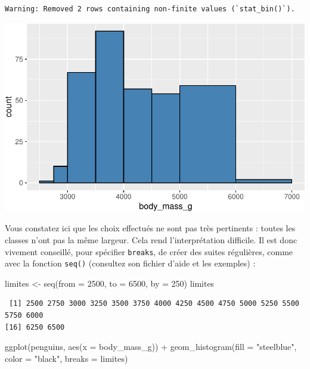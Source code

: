 \documentclass[
  a4paper,
  DIV=11,
  numbers=noendperiod,
  oneside]{scrreprt}
\newenvironment{Shaded}{}{}
\newcommand{\AttributeTok}[1]{\textcolor[rgb]{0.84,0.23,0.29}{#1}}
\newcommand{\DecValTok}[1]{\textcolor[rgb]{0.00,0.36,0.77}{#1}}
\newcommand{\FunctionTok}[1]{\textcolor[rgb]{0.44,0.26,0.76}{#1}}
\newcommand{\NormalTok}[1]{\textcolor[rgb]{0.14,0.16,0.18}{#1}}
\newcommand{\OtherTok}[1]{\textcolor[rgb]{0.44,0.26,0.76}{#1}}
\newcommand{\SpecialCharTok}[1]{\textcolor[rgb]{0.00,0.36,0.77}{#1}}
\newcommand{\StringTok}[1]{\textcolor[rgb]{0.01,0.18,0.38}{#1}}
\begin{document}
\begin{verbatim}
Warning: Removed 2 rows containing non-finite values (`stat_bin()`).
\end{verbatim}

\includegraphics{03-visualization_files/figure-pdf/unnamed-chunk-17-1.pdf}

Vous constatez ici que les choix effectués ne sont pas très pertinents :
toutes les classes n'ont pas la même largeur. Cela rend l'interprétation
difficile. Il est donc vivement conseillé, pour spécifier
\texttt{breaks}, de créer des suites régulières, comme avec la fonction
\texttt{seq()} (consultez son fichier d'aide et les exemples) :

\begin{Shaded}
\begin{Highlighting}[]
\NormalTok{limites }\OtherTok{\textless{}{-}} \FunctionTok{seq}\NormalTok{(}\AttributeTok{from =} \DecValTok{2500}\NormalTok{, }\AttributeTok{to =} \DecValTok{6500}\NormalTok{, }\AttributeTok{by =} \DecValTok{250}\NormalTok{)}
\NormalTok{limites}
\end{Highlighting}
\end{Shaded}

\begin{verbatim}
 [1] 2500 2750 3000 3250 3500 3750 4000 4250 4500 4750 5000 5250 5500 5750 6000
[16] 6250 6500
\end{verbatim}

\begin{Shaded}
\begin{Highlighting}[]
\FunctionTok{ggplot}\NormalTok{(penguins, }\FunctionTok{aes}\NormalTok{(}\AttributeTok{x =}\NormalTok{ body\_mass\_g)) }\SpecialCharTok{+}
  \FunctionTok{geom\_histogram}\NormalTok{(}\AttributeTok{fill =} \StringTok{"steelblue"}\NormalTok{, }\AttributeTok{color =} \StringTok{"black"}\NormalTok{,}
                 \AttributeTok{breaks =}\NormalTok{ limites)}
\end{Highlighting}
\end{Shaded}
\end{document}
